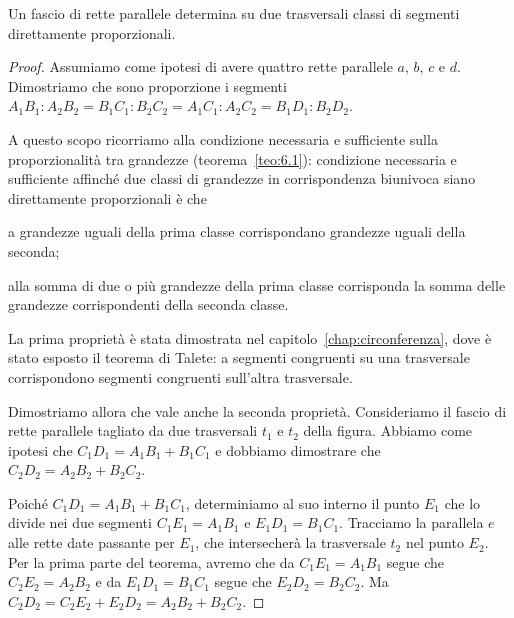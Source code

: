 \begin{teorema}[di Talete]
Un fascio di rette parallele determina su due trasversali classi di 
segmenti direttamente proporzionali.
\end{teorema}

\begin{proof}
Assumiamo come ipotesi di avere quattro rette parallele $a$, $b$, $c$ 
e $d$. Dimostriamo che sono proporzione i segmenti 
$A_1B_1 : A_2B_2 = B_1C_1 : B_2C_2 = A_1C_1 : A_2C_2 = B_1D_1 : 
B_2D_2$.

\begin{figure*}[!htb]
	\centering	
\end{figure*}

A questo scopo ricorriamo alla condizione necessaria e sufficiente 
sulla proporzionalità tra grandezze (teorema~\ref{teo:6.1}):
condizione necessaria e sufficiente affinché due classi di grandezze 
in corrispondenza biunivoca siano direttamente proporzionali è che
\begin{itemize*}
\item a grandezze uguali della prima classe corrispondano grandezze 
uguali della seconda;
\item alla somma di due o più grandezze della prima classe 
corrisponda la somma delle grandezze corrispondenti della seconda 
classe.
\end{itemize*}

La prima proprietà è stata dimostrata nel 
capitolo~\ref{chap:circonferenza}, dove è stato esposto il teorema di 
Talete: a segmenti congruenti su una trasversale corrispondono 
segmenti congruenti sull'altra trasversale.

Dimostriamo allora che vale anche la seconda proprietà.
Consideriamo il fascio di rette parallele tagliato da due trasversali 
$t_1$ e $t_2$ della figura.
Abbiamo come ipotesi che $C_1D_1 = A_1B_1 + B_1C_1$ e dobbiamo 
dimostrare che $C_2D_2 = A_2B_2 + B_2C_2$.

Poiché $C_1D_1 = A_1B_1 + B_1C_1$, determiniamo al suo interno il 
punto $E_1$ che lo divide nei due segmenti $C_1E_1=A_1B_1$ e 
$E_1D_1=B_1C_1$. Tracciamo la parallela $e$ alle rette date passante 
per $E_1$, che intersecherà la trasversale $t_2$ nel punto $E_2$. Per 
la prima parte del teorema, avremo che da $C_1E_1=A_1B_1$ segue che 
$C_2E_2 = A_2B_2$ e da $E_1D_1 = B_1C_1$ segue che $E_2D_2=B_2C_2$. 
Ma $C_2D_2=C_2E_2 + E_2D_2 = A_2B_2 + B_2C_2$.
\end{proof}

